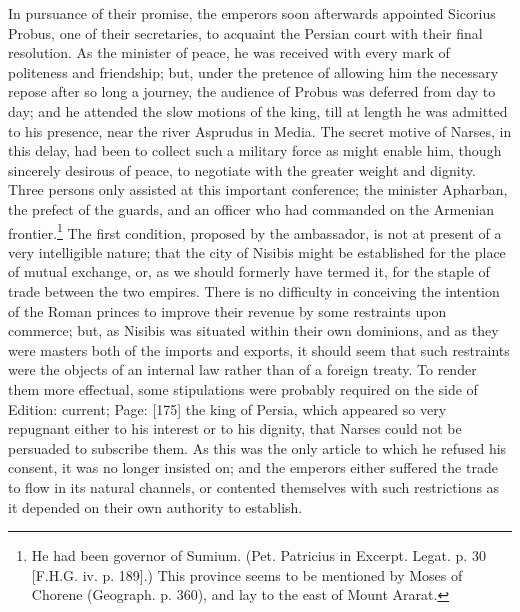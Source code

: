 In pursuance of their promise, the emperors soon afterwards appointed Sicorius Probus, one of their secretaries, to acquaint the Persian court with their final resolution. As the minister of peace, he was received with every mark of politeness and friendship; but, under the pretence of allowing him the necessary repose after so long a journey, the audience of Probus was deferred from day to day; and he attended the slow motions of the king, till at length he was admitted to his presence, near the river Asprudus in Media. The secret motive of Narses, in this delay, had been to collect such a military force as might enable him, though sincerely desirous of peace, to negotiate with the greater weight and dignity. Three persons only assisted at this important conference; the minister Apharban, the prefect of the guards, and an officer who had commanded on the Armenian frontier.\footnote{He had been governor of Sumium. (Pet. Patricius in Excerpt. Legat. p. 30 [F.H.G. iv. p. 189].) This province seems to be mentioned by Moses of Chorene (Geograph. p. 360), and lay to the east of Mount Ararat.} The first condition, proposed by the ambassador, is not at present of a very intelligible nature; that the city of Nisibis might be established for the place of mutual exchange, or, as we should formerly have termed it, for the staple of trade between the two empires. There is no difficulty in conceiving the intention of the Roman princes to improve their revenue by some restraints upon commerce; but, as Nisibis was situated within their own dominions, and as they were masters both of the imports and exports, it should seem that such restraints were the objects of an internal law rather than of a foreign treaty. To render them more effectual, some stipulations were probably required on the side of Edition: current; Page: [175] the king of Persia, which appeared so very repugnant either to his interest or to his dignity, that Narses could not be persuaded to subscribe them. As this was the only article to which he refused his consent, it was no longer insisted on; and the emperors either suffered the trade to flow in its natural channels, or contented themselves with such restrictions as it depended on their own authority to establish.

